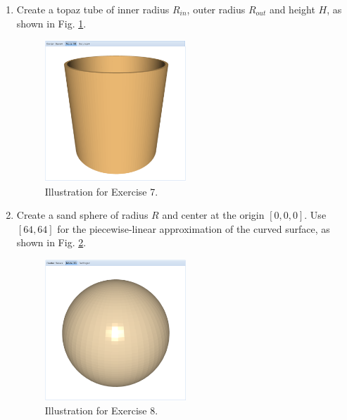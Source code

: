 \documentclass{article}
\begin{document}
\begin{enumerate}
\item Create a topaz tube of inner radius $R_{in}$, outer radius $R_{out}$
and height $H$, as shown in Fig. \ref{fig:a7}.


\begin{figure}[!ht]
\begin{center}
\includegraphics[width=0.5\textwidth]{img/a7-topaz-tube.png}
\end{center}
\vspace{-2mm}
\caption{Illustration for Exercise 7.}
\label{fig:a7}
\end{figure}

\item Create a sand sphere of radius $R$ and center at the origin $[0, 0, 0]$. 
Use $[64, 64]$ for the piecewise-linear approximation of the curved surface, 
as shown in Fig. \ref{fig:a8}.


\begin{figure}[!ht]
\begin{center}
\includegraphics[width=0.5\textwidth]{img/a8-sand-sphere.png}
\end{center}
\vspace{-2mm}
\caption{Illustration for Exercise 8.}
\label{fig:a8}
\end{figure}
\newpage


\end{enumerate}
\end{document}
